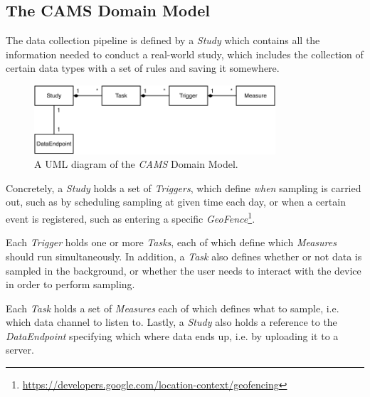 \subsection{The CAMS Domain Model}
The data collection pipeline is defined by a \textit{Study} which contains all the information needed to conduct a real-world study, which includes the collection of certain data types with a set of rules and saving it somewhere. 

\begin{figure}[h]
    \centering
    \includegraphics[width=0.8\textwidth]{images/CAMS-UML.pdf}
    \caption{A UML diagram of the \textit{CAMS} Domain Model.}
    \label{fig:cams_uml}
\end{figure}

Concretely, a \textit{Study} holds a set of \textit{Triggers}, which define \textit{when} sampling is carried out, such as by scheduling sampling at  given time each day, or when a certain event is registered, such as entering a specific \textit{GeoFence}\footnote{\url{https://developers.google.com/location-context/geofencing}}. 

Each \textit{Trigger} holds one or more \textit{Tasks}, each of which define which \textit{Measures} should run simultaneously. In addition, a \textit{Task} also defines whether or not data is sampled in the background, or whether the user needs to interact with the device in order to perform sampling. 

Each \textit{Task} holds a set of \textit{Measures} each of which defines what to sample, i.e. which data channel to listen to. Lastly, a \textit{Study} also holds a reference to the \textit{DataEndpoint} specifying which where data ends up, i.e. by uploading it to a server.

